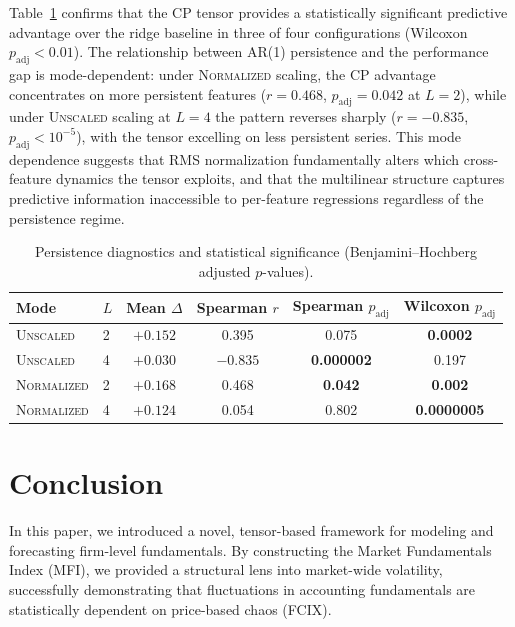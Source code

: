 \documentclass[pdflatex,sn-mathphys-num]{sn-jnl}%
\theoremstyle{thmstyleone}%
\theoremstyle{thmstyletwo}%
\theoremstyle{thmstylethree}%
\begin{document}
Table~\ref{Tab:Persistence_Stats} confirms that the CP tensor provides a statistically significant predictive advantage over the ridge baseline in three of four configurations (Wilcoxon $p_{\mathrm{adj}}<0.01$). The relationship between AR(1) persistence and the performance gap is mode-dependent: under \textsc{Normalized} scaling, the CP advantage concentrates on more persistent features ($r=0.468$, $p_{\mathrm{adj}}=0.042$ at $L=2$), while under \textsc{Unscaled} scaling at $L=4$ the pattern reverses sharply ($r=-0.835$, $p_{\mathrm{adj}}<10^{-5}$), with the tensor excelling on less persistent series. This mode dependence suggests that RMS normalization fundamentally alters which cross-feature dynamics the tensor exploits, and that the multilinear structure captures predictive information inaccessible to per-feature regressions regardless of the persistence regime.

\begin{table}[!htbp]
\centering
\caption{Persistence diagnostics and statistical significance (Benjamini--Hochberg adjusted $p$-values).}
\label{Tab:Persistence_Stats}
\begin{tabular}{llcccc}
\toprule
Mode & $L$ & Mean $\Delta$ & Spearman $r$ & Spearman $p_{\mathrm{adj}}$ & Wilcoxon $p_{\mathrm{adj}}$ \\
\midrule
\textsc{Unscaled}   & 2 & $+0.152$ & 0.395 & 0.075 & \textbf{0.0002} \\
\textsc{Unscaled}   & 4 & $+0.030$ & $-0.835$ & \textbf{0.000002} & 0.197 \\
\textsc{Normalized} & 2 & $+0.168$ & 0.468 & \textbf{0.042} & \textbf{0.002} \\
\textsc{Normalized} & 4 & $+0.124$ & 0.054 & 0.802 & \textbf{0.0000005} \\
\bottomrule
\end{tabular}
\end{table}






\section{Conclusion}

In this paper, we introduced a novel, tensor-based framework for modeling and forecasting firm-level fundamentals. By constructing the Market Fundamentals Index (MFI), we provided a structural lens into market-wide volatility, successfully demonstrating that fluctuations in accounting fundamentals are statistically dependent on price-based chaos (FCIX).
\end{document}
